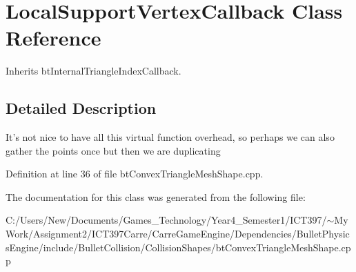 \hypertarget{class_local_support_vertex_callback}{
\section{LocalSupportVertexCallback Class Reference}
\label{class_local_support_vertex_callback}
}
Inherits btInternalTriangleIndexCallback.



\subsection{Detailed Description}
It's not nice to have all this virtual function overhead, so perhaps we can also gather the points once but then we are duplicating 

Definition at line 36 of file btConvexTriangleMeshShape.cpp.

The documentation for this class was generated from the following file:\begin{CompactItemize}
\item 
C:/Users/New/Documents/Games\_\-Technology/Year4\_\-Semester1/ICT397/$\sim$My Work/Assignment2/ICT397Carre/CarreGameEngine/Dependencies/BulletPhysicsEngine/include/BulletCollision/CollisionShapes/btConvexTriangleMeshShape.cpp\end{CompactItemize}
